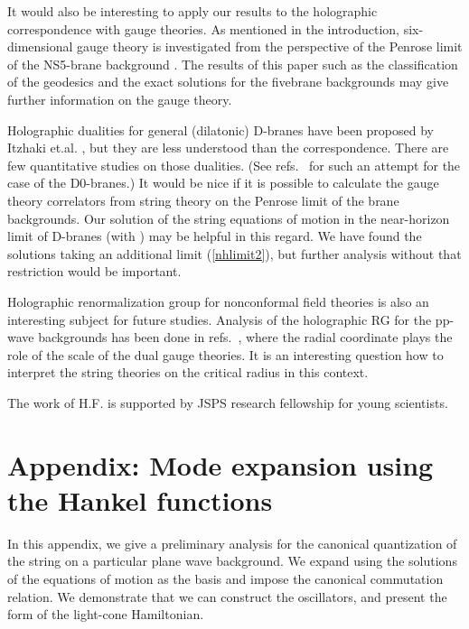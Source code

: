 \documentclass[a4paper,12pt]{article}
\begin{document}
It would also be interesting to  apply our results to the 
holographic correspondence with gauge theories. 
As mentioned in the introduction,
six-dimensional gauge theory is investigated from
the perspective of the Penrose limit of the NS5-brane 
background \cite{HuRaVe,OzSa}. The results of this paper
such as the classification of  the geodesics and the exact 
solutions for the fivebrane backgrounds
may give further information on the gauge theory.

Holographic dualities for general (dilatonic) 
D\coordHE{}-branes have been proposed by  
Itzhaki et.al. \cite{IzMaSoYa},
but they are less understood than the \coordHE{} 
correspondence. There are few
quantitative studies on those dualities.
(See refs.~\cite{SeYo, Se} for such
an attempt for the case of the D0-branes.)
It would be nice if it is possible to 
calculate the gauge theory correlators from string 
theory on the Penrose limit of
the brane backgrounds.
Our solution of the string equations of motion
in the near-horizon limit of D\coordHE{}-branes (with
\coordHE{}) may be helpful in this regard. 
We have found the solutions
taking an additional limit (\ref{nhlimit2}), but
further analysis without that restriction would
be important. 

Holographic renormalization group for nonconformal field 
theories is also an interesting subject for future studies.
Analysis of the holographic RG for the pp-wave backgrounds 
has been done in refs.~\cite{CoHaKeWa, GiPaSo, BrJoLoMy},
where the radial coordinate plays the role of the scale of 
the dual gauge theories. It is an interesting question
how to interpret the string theories on the critical
radius in this context.



\vspace{1cm}



The work of H.F. is supported 
by JSPS research fellowship for young scientists.


\section*{Appendix: Mode expansion using the Hankel functions}
\renewcommand{\theequation}{A.\arabic{equation}}
\setcounter{equation}{0}
In this appendix, we give a preliminary analysis for the canonical
quantization of the string on a particular plane wave background.
We expand \coordHE{} using the solutions of the equations
of motion as the basis and impose the canonical 
commutation relation.
We demonstrate that we can construct the oscillators,
and present the form of the light-cone Hamiltonian.
\end{document}
